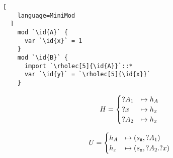 
\begin{minipage}[l]{0.233\textwidth}
  \begin{lstlisting}[
    language=MiniMod
  ]
    mod `\id{A}` {
      var `\id{x}` = 1
    }
    mod `\id{B}` {
      import `\rholec[5]{\id{A}}`::*
      var `\id{y}` = `\rholec[5]{\id{x}}`
    }
  \end{lstlisting}%
\end{minipage}%
\begin{minipage}{0.35\textwidth}
  \[
    H = \begin{cases}
      \text{?$A_1$} &\mapsto h_A
      \\
      \text{?$x$} &\mapsto h_x
      \\
      \text{?$A_2$} &\mapsto h_x
    \end{cases}
  \]
\end{minipage}%
\begin{minipage}{0.4\textwidth}
  \[
    U = \begin{cases}
      h_A &\mapsto (s_{\texttt{A}}, \text{?$A$}_1)
      \\
      h_x &\mapsto (s_{\texttt{x}}, \text{?$A_2$}\mathtt{.}\text{?$x$})
    \end{cases}
  \]
\end{minipage}
\\
\vspace{1em}
